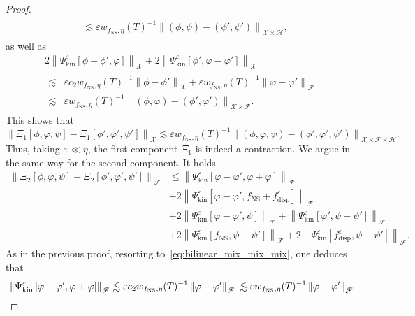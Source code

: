 \documentclass[10pt]{amsart}
\theoremstyle{definition}\newtheorem{defi}[theo]{Definition}\newtheorem{rema}[theo]{Remark}\newtheorem{exam}[theo]{Example}\newtheorem{exem}[theo]{Example}\newtheorem{nota}[theo]{Notation}
\newcommand{\ns}{\mathrm{NS}}
\newcommand{\kin}{\mathrm{kin}}
\newcommand{\disp}{\mathrm{disp}}
\newcommand{\FFF}{\mathscr{F}}
\newcommand{\HHH}{\mathscr{H}}
\newcommand{\GGG}{\mathscr{X}}
\newcommand{\SSSs}{\HHH}
\newcommand{\SSSl}{\GGG}
\newcommand{\SSSm}{\FFF}
\renewcommand*\le{\leqslant}
\newcommand*\eps{{\varepsilon}}
\begin{document}
\begin{proof}
\begin{multline*}
\begin{aligned}
&\lesssim \eps w_{ f_\ns, \eta }(T)^{-1} \left\| (\phi, \psi) - (\phi', \psi') \right\|_{ \SSSl \times \SSSs },
\end{aligned}
\end{multline*}
as well as
\begin{multline*}
2 \left\| \Psi^\eps_\kin\left[\phi - \phi', \varphi\right] \right\|_{ \SSSl }  + 2 \left\| \Psi^\eps_\kin\left[\phi', \varphi - \varphi'\right] \right\|_{ \SSSl } \\
\begin{aligned}
\lesssim & \eps c_2 w_{ f_\ns, \eta }(T)^{-1} \left\| \phi - \phi' \right\|_{ \SSSl } + \eps w_{ f_\ns, \eta }(T)^{-1} \left\| \varphi - \varphi' \right\|_{ \SSSm } \\
\lesssim & \eps w_{ f_\ns, \eta }(T)^{-1}\left \| (\phi, \varphi) - (\phi', \varphi') \right\|_{ \SSSl \times \SSSm }.
\end{aligned}
\end{multline*}
This shows that
\[
\left\| \Xi_1\left [\phi, \varphi, \psi\right] - \Xi_1\left [\phi', \varphi', \psi'\right] \right\|_{ \SSSl } \lesssim \eps w_{ f_\ns, \eta }(T)^{-1} \left \| (\phi, \varphi, \psi) - (\phi', \varphi', \psi') \right\|_{ \SSSl \times \SSSm \times \SSSs }.
\]
Thus, taking $\eps \ll \eta$, the first component $\Xi_1$ is indeed a contraction. We argue in the same way for the second component. It holds
\begin{align*}
\left\| \Xi_2\left[\phi, \varphi, \psi\right] - \Xi_2\left[\phi', \varphi', \psi'\right] \right\|_{ \SSSm } &\le \left\| \Psi^\eps_\kin\left[\varphi - \varphi', \varphi + \varphi\right] \right\|_{ \SSSm } \\
& + 2 \left\| \Psi^\eps_\kin \left[\varphi - \varphi', f_\ns + f^\eps_\disp\right] \right\|_{ \SSSm } \\
& + 2 \left\| \Psi^\eps_\kin\left[\varphi - \varphi', \psi\right] \right\|_{ \SSSm } + \left\| \Psi^\eps_\kin \left[\varphi', \psi - \psi'\right] \right\|_{ \SSSm } \\
& + 2 \left\| \Psi^\eps_\kin \left[f_\ns, \psi - \psi'\right] \right\|_{ \SSSm } + 2 \left\| \Psi^\eps_\kin\left[f^\eps_\disp, \psi - \psi'\right] \right\|_{ \SSSm }.
\end{align*}
As in the previous proof, resorting to~\eqref{eq:bilinear_mix_mix_mix}, one deduces that
\[
\left\| \Psi^\eps_\kin \left[\varphi - \varphi', \varphi + \varphi\right] \right\|_{ \SSSm } \lesssim \eps c_2 w_{f_\ns, \eta}(T)^{-1} \left\| \varphi - \varphi' \right\|_{\SSSm} \\
\lesssim \eps w_{f_\ns, \eta}(T)^{-1} \left\| \varphi - \varphi' \right\|_{\SSSm}
\]
\end{proof}
\end{document}
